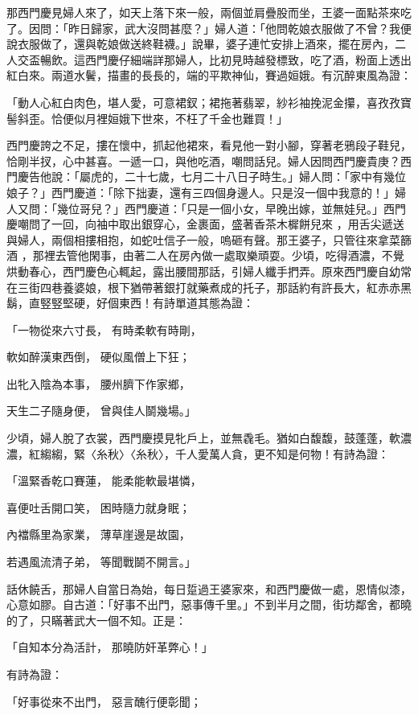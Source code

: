 那西門慶見婦人來了，如天上落下來一般，兩個並肩疊股而坐，王婆一面點茶來吃了。因問：「昨日歸家，武大沒問甚麼？」婦人道：「他問乾娘衣服做了不曾？我便說衣服做了，還與乾娘做送終鞋襪。」說畢，婆子連忙安排上酒來，擺在房內，二人交盃暢飲。這西門慶仔細端詳那婦人，比初見時越發標致，吃了酒，粉面上透出紅白來。兩道水鬢，描畫的長長的，端的平欺神仙，賽過姮娥。有沉醉東風為證：

「動人心紅白肉色，堪人愛，可意裙釵；裙拖著翡翠，紗衫袖挽泥金攥，喜孜孜寶髻斜歪。恰便似月裡姮娥下世來，不枉了千金也難買！」

西門慶誇之不足，摟在懷中，抓起他裙來，看見他一對小腳，穿著老鴉段子鞋兒，恰剛半扠，心中甚喜。一遞一口，與他吃酒，嘲問話兒。婦人因問西門慶貴庚？西門慶告他說：「屬虎的，二十七歲，七月二十八日子時生。」婦人問：「家中有幾位娘子？」西門慶道：「除下拙妻，還有三四個身邊人。只是沒一個中我意的！」婦人又問：「幾位哥兒？」西門慶道：「只是一個小女，早晚出嫁，並無娃兒。」西門慶嘲問了一回，向袖中取出銀穿心，金裹面，盛著香茶木樨餅兒來 ，用舌尖遞送與婦人，兩個相摟相抱，如蛇吐信子一般，嗚砸有聲。那王婆子，只管往來拿菜篩酒 ，那裡去管他閑事，由著二人在房內做一處取樂頑耍。少頃，吃得酒濃，不覺烘動春心，西門慶色心輒起，露出腰間那話，引婦人纖手捫弄。原來西門慶自幼常在三街四巷養婆娘，根下猶帶著銀打就藥煮成的托子，那話約有許長大，紅赤赤黑鬍，直竪竪堅硬，好個東西！有詩單道其態為證：

「一物從來六寸長，  有時柔軟有時剛，

軟如醉漢東西倒，  硬似風僧上下狂；

出牝入陰為本事，  腰州臍下作家鄉，

天生二子隨身便，  曾與佳人鬬幾場。」

少頃，婦人脫了衣裳，西門慶摸見牝戶上，並無毳毛。猶如白馥馥，鼓蓬蓬，軟濃濃，紅縐縐，緊〈糸秋〉〈糸秋〉，千人愛萬人貪，更不知是何物！有詩為證：

「溫緊香乾口賽蓮，  能柔能軟最堪憐，

喜便吐舌開口笑，  困時隨力就身眠；

內襠縣里為家業，  薄草崖邊是故園，

若遇風流清子弟，  等聞戰鬬不開言。」

話休饒舌，那婦人自當日為始，每日踅過王婆家來，和西門慶做一處，恩情似漆，心意如膠。自古道：「好事不出門，惡事傳千里。」不到半月之間，街坊鄰舍，都曉的了，只瞞著武大一個不知。正是：

「自知本分為活計，  那曉防奸革弊心！」

有詩為證：

「好事從來不出門，  惡言醜行便彰聞；

